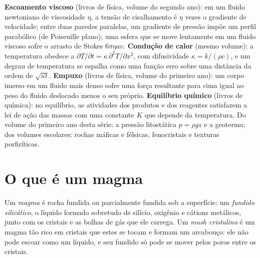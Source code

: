 \begin{recall}
\textbf{Escoamento viscoso} (livros de física, volume do segundo ano): em um fluido newtoniano de
viscosidade $\eta$, a tensão de cisalhamento é $\eta$ vezes o gradiente de velocidade; entre
duas paredes paralelas, um gradiente de pressão impõe um perfil parabólico (de Poiseuille
plano); uma esfera que se move lentamente em um fluido viscoso sofre o arrasto de Stokes
$6\pi\eta a v$. \textbf{Condução de calor} (mesmo volume): a temperatura obedece a
$\partial T/\partial t = \kappa\,\partial^2T/\partial x^2$, com difusividade $\kappa = k/(\rho
c)$, e um degrau de temperatura se espalha como uma função erro sobre uma distância da
ordem de $\sqrt{\kappa t}$. \textbf{Empuxo} (livros de física, volume do primeiro ano): um corpo
imerso em um fluido mais denso sofre uma força resultante para cima igual ao peso do fluido
deslocado menos o seu próprio. \textbf{Equilíbrio químico} (livros de química): no
equilíbrio, as atividades dos produtos e dos reagentes satisfazem a lei de ação
das massas com uma constante $K$ que depende da temperatura. Do volume do primeiro ano
desta série: a pressão litostática $p = \rho g z$ e a geoterma; dos
volumes escolares: rochas máficas e félsicas, fenocristais e texturas porfiríticas.
\end{recall}

\section{O que é um magma}

\begin{definition}[Magma]\label{def:b2:magma-emplacement:magma}
Um \emph{magma} é rocha fundida ou parcialmente fundida sob a superfície: um
\emph{fundido silicático}, o líquido formado sobretudo de silício,
oxigênio e cátions metálicos, junto com os cristais e as bolhas de gás que ele carrega.
Um \emph{mush cristalino} é um magma tão rico em cristais que estes
se tocam e formam um arcabouço: ele não pode escoar como um líquido, e seu fundido só pode
se mover pelos poros entre os cristais.
\end{definition}

